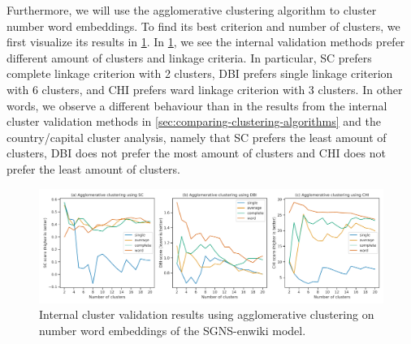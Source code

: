 Furthermore, we will use the agglomerative clustering algorithm to cluster number word embeddings. To find its best criterion and number of clusters, we first visualize its results in \cref{fig:cluster-analysis-agglomerative-numbers-word-group-internal-cluster-validation}. In \cref{fig:cluster-analysis-agglomerative-numbers-word-group-internal-cluster-validation}, we see the internal validation methods prefer different amount of clusters and linkage criteria. In particular, SC prefers complete linkage criterion with 2 clusters, DBI prefers single linkage criterion with 6 clusters, and CHI prefers ward linkage criterion with 3 clusters. In other words, we observe a different behaviour than in the results from the internal cluster validation methods in \cref{sec:comparing-clustering-algorithms} and the country/capital cluster analysis, namely that SC prefers the least amount of clusters, DBI does not prefer the most amount of clusters and CHI does not prefer the least amount of clusters.
\begin{figure}[H]
    \centering
    \includegraphics[width=\textwidth]{thesis/figures/cluster-analysis-agglomerative-numbers-word-group-internal-cluster-validation.pdf}
    \caption{Internal cluster validation results using agglomerative clustering on number word embeddings of the SGNS-enwiki model.}
    \label{fig:cluster-analysis-agglomerative-numbers-word-group-internal-cluster-validation}
\end{figure}

